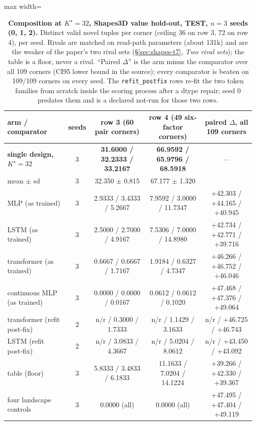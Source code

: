 \documentclass{article} %
\newcommand{\Kstar}{\ensuremath{K^{\star}}}
\begin{document}
\begin{table}[t]
\centering\small
\caption{\textbf{Composition at $\Kstar=32$, Shapes3D value hold-out, TEST, $n=3$ seeds
(0, 1, 2).} Distinct valid novel tuples per corner (ceiling 36 on row 3, 72 on row 4), per %
seed. Rivals are matched on read-path parameters (about 131k) and are the weaker of the paper's two rival sets (\S\ref{sec:shapes-t7}, \emph{Two rival sets}); the table is a floor, never a %
rival. ``Paired $\Delta$'' is the arm minus the comparator over all 109 corners (CI95 lower %
bound in the source); every comparator is beaten on 109/109 corners on every seed. The %
\texttt{refit\_postfix} rows re-fit the two token families from scratch inside the scoring
process after a dtype repair; seed 0 predates them and is a declared not-run for those two
rows.}
\label{tab:t7}
\setlength{\tabcolsep}{3.2pt}
\begin{adjustbox}{max width=\linewidth}\begin{tabular}{lcccc}
\toprule
arm / comparator & seeds & row 3 (60 pair corners) & row 4 (49 six-factor corners) & paired $\Delta$, all 109 corners \\ %
\midrule
\textbf{single design, $\Kstar=32$} & 3 & \textbf{31.6000 / 32.2333 / 33.2167} & \textbf{66.9592 / 65.9796 / 68.5918} & --- \\
\quad mean $\pm$ sd & 3 & 32.350 $\pm$ 0.815 & 67.177 $\pm$ 1.320 & \\
MLP (as trained) & 3 & 2.9333 / 3.4333 / 5.2667 & 7.9592 / 3.0000 / 11.7347 & +42.303 / +44.165 / +40.945 \\
LSTM (as trained) & 3 & 2.5000 / 2.7000 / 4.9167 & 7.5306 / 7.0000 / 14.8980 & +42.734 / +42.771 / +39.716 \\
transformer (as trained) & 3 & 0.6667 / 0.6667 / 1.7167 & 1.9184 / 0.6327 / 4.7347 & +46.266 / +46.752 / +46.046 \\
continuous MLP (as trained) & 3 & 0.0000 / 0.0000 / 0.0167 & 0.0612 / 0.0612 / 0.1020 & +47.468 / +47.376 / +49.064 \\
transformer (refit post-fix) & 2 & n/r / 0.3000 / 1.7333 & n/r / 1.1429 / 3.1633 & n/r / +46.725 / +46.743 \\
LSTM (refit post-fix) & 2 & n/r / 3.0833 / 4.3667 & n/r / 5.0204 / 8.0612 & n/r / +43.450 / +43.092 \\
table (floor) & 3 & 5.8333 / 3.4833 / 6.1833 & 11.1633 / 7.0204 / 14.1224 & +39.266 / +42.330 / +39.367 \\
\midrule
four landscape controls & 3 & 0.0000 (all) & 0.0000 (all) & +47.495 / +47.404 / +49.119 \\
\bottomrule
\end{tabular}\end{adjustbox}
\end{table}
\end{document}
